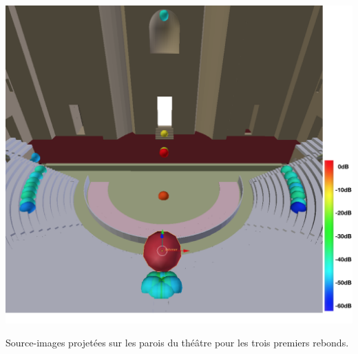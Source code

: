 \begin{figureth}
	\includegraphics[width=0.8\linewidth]{images/si_configInitale}
	\caption{Source-images projetées sur les parois du théâtre pour les trois premiers rebonds.}
	\label{si_configInitale}
\end{figureth}

